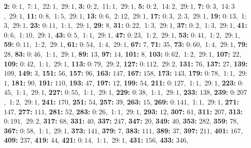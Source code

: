 \textsf{\bfseries 2:} 0:\,$1$,\ 7:\,$1$,\ 22:\,$1$,\ 29:\,$1$, \textsf{\bfseries 3:} 0:\,$2$,\ 11:\,$1$,\ 29:\,$1$, \textsf{\bfseries 5:} 0:\,$2$,\ 14:\,$2$,\ 29:\,$1$, \textsf{\bfseries 7:} 0:\,$3$,\ 14:\,$3$,\ 29:\,$1$, \textsf{\bfseries 11:} 0:\,$8$,\ 1:\,$5$,\ 29:\,$1$, \textsf{\bfseries 13:} 0:\,$6$,\ 2:\,$12$,\ 29:\,$1$, \textsf{\bfseries 17:} 0:\,$3$,\ 2:\,$3$,\ 29:\,$1$, \textsf{\bfseries 19:} 0:\,$13$,\ 1:\,$3$,\ 29:\,$1$, \textsf{\bfseries 23:} 0:\,$11$,\ 1:\,$1$,\ 29:\,$1$, \textsf{\bfseries 29:} $8$, \textsf{\bfseries 31:} 0:\,$22$,\ 1:\,$3$,\ 29:\,$1$, \textsf{\bfseries 37:} 0:\,$2$,\ 1:\,$3$,\ 29:\,$1$, \textsf{\bfseries 41:} 0:\,$6$,\ 1:\,$10$,\ 29:\,$1$, \textsf{\bfseries 43:} 0:\,$5$,\ 1:\,$1$,\ 29:\,$1$, \textsf{\bfseries 47:} 0:\,$23$,\ 1:\,$2$,\ 29:\,$1$, \textsf{\bfseries 53:} 0:\,$41$,\ 1:\,$2$,\ 29:\,$1$, \textsf{\bfseries 59:} 0:\,$11$,\ 1:\,$2$,\ 29:\,$1$, \textsf{\bfseries 61:} 0:\,$54$,\ 1:\,$4$,\ 29:\,$1$, \textsf{\bfseries 67:} $7$, \textsf{\bfseries 71:} $35$, \textsf{\bfseries 73:} 0:\,$60$,\ 1:\,$4$,\ 29:\,$1$, \textsf{\bfseries 79:} $28$, \textsf{\bfseries 83:} 0:\,$46$,\ 1:\,$1$,\ 29:\,$1$, \textsf{\bfseries 89:} $13$, \textsf{\bfseries 97:} $14$, \textsf{\bfseries 101:} $8$, \textsf{\bfseries 103:} 0:\,$62$,\ 1:\,$2$,\ 29:\,$1$, \textsf{\bfseries 107:} $22$, \textsf{\bfseries 109:} 0:\,$42$,\ 1:\,$1$,\ 29:\,$1$, \textsf{\bfseries 113:} 0:\,$79$,\ 29:\,$2$, \textsf{\bfseries 127:} 0:\,$112$,\ 29:\,$2$, \textsf{\bfseries 131:} $76$, \textsf{\bfseries 137:} $27$, \textsf{\bfseries 139:} $109$, \textsf{\bfseries 149:} $3$, \textsf{\bfseries 151:} $56$, \textsf{\bfseries 157:} $96$, \textsf{\bfseries 163:} $147$, \textsf{\bfseries 167:} $158$, \textsf{\bfseries 173:} $143$, \textsf{\bfseries 179:} 0:\,$78$,\ 1:\,$1$,\ 29:\,$1$, \textsf{\bfseries 181:} $90$, \textsf{\bfseries 191:} $110$, \textsf{\bfseries 193:} $47$, \textsf{\bfseries 197:} $12$, \textsf{\bfseries 199:} $54$, \textsf{\bfseries 211:} 0:\,$127$,\ 1:\,$1$,\ 29:\,$1$, \textsf{\bfseries 223:} 0:\,$45$,\ 1:\,$1$,\ 29:\,$1$, \textsf{\bfseries 227:} 0:\,$55$,\ 1:\,$1$,\ 29:\,$1$, \textsf{\bfseries 229:} 0:\,$38$,\ 1:\,$1$,\ 29:\,$1$, \textsf{\bfseries 233:} $138$, \textsf{\bfseries 239:} 0:\,$207$,\ 1:\,$2$,\ 29:\,$1$, \textsf{\bfseries 241:} $170$, \textsf{\bfseries 251:} $54$, \textsf{\bfseries 257:} $39$, \textsf{\bfseries 263:} $15$, \textsf{\bfseries 269:} 0:\,$141$,\ 1:\,$1$,\ 29:\,$1$, \textsf{\bfseries 271:} $147$, \textsf{\bfseries 277:} $111$, \textsf{\bfseries 281:} $52$, \textsf{\bfseries 283:} 0:\,$26$,\ 1:\,$1$,\ 29:\,$1$, \textsf{\bfseries 293:} $12$, \textsf{\bfseries 307:} $61$, \textsf{\bfseries 311:} $207$, \textsf{\bfseries 313:} 0:\,$191$,\ 29:\,$2$, \textsf{\bfseries 317:} $68$, \textsf{\bfseries 331:} $40$, \textsf{\bfseries 337:} $247$, \textsf{\bfseries 347:} $20$, \textsf{\bfseries 349:} $40$, \textsf{\bfseries 353:} $282$, \textsf{\bfseries 359:} $78$, \textsf{\bfseries 367:} 0:\,$58$,\ 1:\,$1$,\ 29:\,$1$, \textsf{\bfseries 373:} $141$, \textsf{\bfseries 379:} $7$, \textsf{\bfseries 383:} $111$, \textsf{\bfseries 389:} $37$, \textsf{\bfseries 397:} $211$, \textsf{\bfseries 401:} $167$, \textsf{\bfseries 409:} $237$, \textsf{\bfseries 419:} $44$, \textsf{\bfseries 421:} 0:\,$14$,\ 1:\,$1$,\ 29:\,$1$, \textsf{\bfseries 431:} $156$, \textsf{\bfseries 433:} $346$, 
